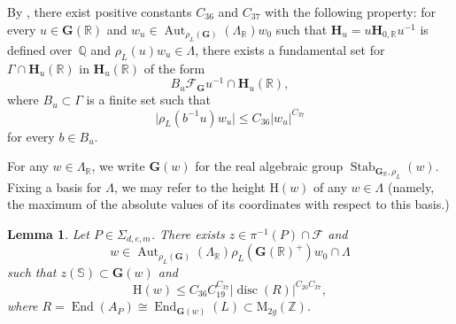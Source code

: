 \documentclass[JEP,XML,SOM,Unicode,NoFloatCountersInSection]{cedram}
\newcommand{\bQ}{\mathbb{Q}}
\newcommand{\bR}{\mathbb{R}}
\newcommand{\bZ}{\mathbb{Z}}
\newcommand{\cF}{\mathcal{F}}
\newcommand{\gG}{\mathbf{G}}
\newcommand{\gH}{\mathbf{H}}
\newcommand{\rH}{\mathrm{H}}
\newcommand{\rM}{\mathrm{M}}
\DeclareMathOperator{\Aut}{Aut}
\DeclareMathOperator{\disc}{disc}
\DeclareMathOperator{\End}{End}
\DeclareMathOperator{\Stab}{Stab}
\newcommand{\abs}[1]{\lvert #1 \rvert}
\newtheorem{lemma}{Lemma}[section]
\begin{document}
By \cite[Th.\,1.2]{QRTUI}, there exist positive constants $C_{36}$ and $C_{37}$ with the following property: for every $u\in\gG(\bR)$ and $w_u\in \Aut_{\rho_L(\gG)}(\Lambda_\bR) w_0$ such that $\gH_u = u \gH_{0,\bR} u^{-1}$ is defined over~$\bQ$ and $\rho_L(u) w_u \in \Lambda$, there exists a fundamental set for $\Gamma\cap\gH_u(\bR)$ in $\gH_u(\bR)$ of the form
\[
B_u\cF_\gG u^{-1}\cap\gH_u(\bR),\]
where $B_u\subset\Gamma$ is a finite set such that
\[\abs{\rho_L(b^{-1}u)w_u} \leq C_{36} \abs{w_u}^{C_{37}}\]
for every $b\in B_u$.

For any $w\in\Lambda_\bR$, we write $\gG(w)$ for the real algebraic group $\Stab_{\gG_\bR,\rho_L}(w)$. Fixing a basis for $\Lambda$, we may refer to the height $\rH(w)$ of any $w\in\Lambda$ (namely, the maximum of the absolute values of its coordinates with respect to this basis.)

\begin{lemma} \label{z-w}
Let $P\in\Sigma_{d,e,m}$. There exists $z\in \pi^{-1}(P)\cap\cF$ and
\[w\in \Aut_{\rho_L(\gG)}(\Lambda_\bR)\rho_L(\gG(\bR)^+)w_0\cap\Lambda\]
such that $z(\mathbb{S})\subset\gG(w)$ and
\[\rH(w)\leq C_{36}C_{19}^{C_{37}} \abs{\disc(R)}^{C_{20}C_{37}},\]
where $R=\End(A_P)\cong\End_{\gG(w)}(L)\subset \rM_{2g}(\bZ)$.
\end{lemma}
\end{document}
